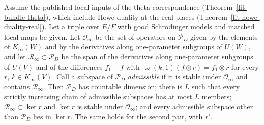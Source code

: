 \begin{lemma}\label{th-howe-archimedean}
Assume the published local inputs of the theta correspondence
(Theorem~\ref{lit-bundle-theta}), which include Howe duality at the real places
(Theorem~\ref{lit-howe-duality-real}). Let a triple over $E/F$ with good
Schrödinger models and matched local maps be given. Let $\mathcal O_\infty$ be
the set of operators on $\mathcal P_D$ given by the elements of $K_\infty(W)$
and by the derivatives along one-parameter subgroups of $U(W)$, and let
$\mathcal R_\infty\subset\mathcal P_D$ be the span of the derivatives along
one-parameter subgroups of $U(V)$ and of the differences $f_1-f$ with
$\varpi(k,1)(f\otimes r)=f_1\otimes r$ for every $r$, $k\in K_\infty(V)$.
Call a subspace of $\mathcal P_D$ \emph{admissible} if it is stable under
$\mathcal O_\infty$ and contains $\mathcal R_\infty$. Then $\mathcal P_D$ has
countable dimension; there is $L$ such that every strictly increasing chain of
admissible subspaces has at most $L$ members; $\mathcal R_\infty\subset\ker r$
and $\ker r$ is stable under $\mathcal O_\infty$; and every admissible
subspace other than $\mathcal P_D$ lies in $\ker r$. The same holds for the
second pair, with $r'$.
\end{lemma}
